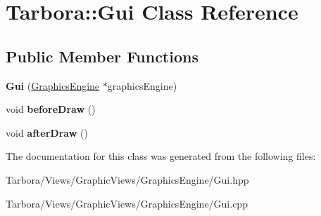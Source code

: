 \hypertarget{classTarbora_1_1Gui}{}\section{Tarbora\+:\+:Gui Class Reference}
\label{classTarbora_1_1Gui}
\subsection*{Public Member Functions}
\begin{DoxyCompactItemize}
\item 
\mbox{\label{classTarbora_1_1Gui_ad1d1a0c9d0d8c43032e6d0935aa44358}} 
{\bfseries Gui} (\hyperlink{classTarbora_1_1GraphicsEngine}{Graphics\+Engine} $\ast$graphics\+Engine)
\item 
\mbox{\label{classTarbora_1_1Gui_a222e2d46988ee41920484f107e2d4f51}} 
void {\bfseries before\+Draw} ()
\item 
\mbox{\label{classTarbora_1_1Gui_a7cc91a9d8cffac7a10f7d876b1a0017f}} 
void {\bfseries after\+Draw} ()
\end{DoxyCompactItemize}


The documentation for this class was generated from the following files\+:\begin{DoxyCompactItemize}
\item 
Tarbora/\+Views/\+Graphic\+Views/\+Graphics\+Engine/Gui.\+hpp\item 
Tarbora/\+Views/\+Graphic\+Views/\+Graphics\+Engine/Gui.\+cpp\end{DoxyCompactItemize}
